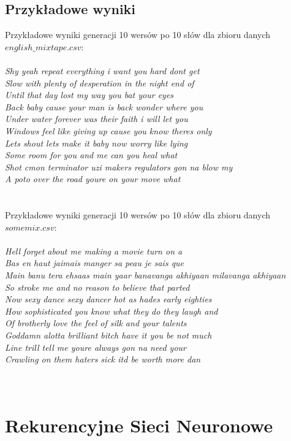 \documentclass{article}
\begin{document}
\subsection{Przykładowe wyniki}
\newpage
\begin{center}
    Przykładowe wyniki generacji 10 wersów po 10 słów dla zbioru danych $english\_mixtape.csv$: \\
    \leavevmode\\
    \textsl{Shy yeah repeat everything i want you hard dont get \\
            Slow with plenty of desperation in the night end of \\
            Until that day lost my way you bat your eyes \\
            Back baby cause your man is back wonder where you \\
            Under water forever was their faith i will let you \\
            Windows feel like giving up cause you know theres only \\
            Lets shout lets make it baby now worry like lying \\
            Some room for you and me can you heal what \\
            Shot cmon terminator uzi makers regulators gon na blow my \\
            A poto over the road youre on your move what} \\
    \leavevmode\\\leavevmode\\
    Przykładowe wyniki generacji 10 wersów po 10 słów dla zbioru danych $somemix.csv$: \\
    \leavevmode\\
    \textsl{Hell forget about me making a movie turn on a \\
            Bas en haut jaimais manger sa peau je sais que \\
            Main banu tera ehsaas main yaar banavanga akhiyaan milavanga akhiyaan \\
            So stroke me and no reason to believe that parted \\
            Now sexy dance sexy dancer hot as hades early eighties \\
            How sophisticated you know what they do they laugh and \\
            Of brotherly love the feel of silk and your talents \\
            Goddamn alotta brilliant bitch have it you be not much \\
            Line trill tell me youre always gon na need your \\
            Crawling on them haters sick itd be worth more dan} \\
    \leavevmode\\\leavevmode\\
\end{center}
\section{Rekurencyjne Sieci Neuronowe}
\end{document}
